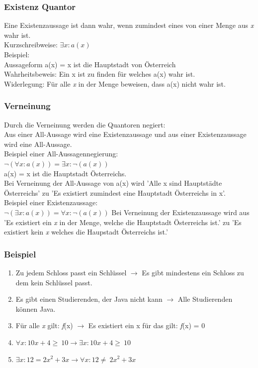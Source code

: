 \documentclass{article}
\begin{document}
	\subsubsection{Existenz Quantor}
	Eine Existenzaussage ist dann wahr, wenn zumindest eines von einer Menge aus \textit{x} wahr ist. \\
	Kurzschreibweise:
	$\exists x:a(x)$ \\
	Beispiel:\\
	Aussageform a(x) = x ist die Hauptstadt von Österreich \\
	Wahrheitsbeweis: Ein x ist zu finden für welches a(x) wahr ist. \\
	Widerlegung: Für alle \textit{x} in der Menge beweisen, dass a(x) nicht wahr ist.
	\subsubsection{Verneinung}
	Durch die Verneinung werden die Quantoren negiert: \\
	Aus einer All-Aussage wird eine Existenzaussage und aus einer Existenzaussage wird eine All-Aussage. \\

	Beispiel einer All-Aussagennegierung: \\
	$\neg(\forall x:a(x)) = \exists x:\neg(a(x))$ \\
	a(x) = x ist die Hauptstadt Österreichs. \\
	Bei Verneinung der All-Aussage von a(x) wird 'Alle x sind Hauptstädte Österreichs' zu 'Es existiert zumindest eine Hauptstadt Österreichs in x'. \\
	Beispiel einer Existenzaussage: \\
	$\neg (\exists x:a(x)) = \forall x:\neg (a(x))$
	Bei Verneinung der Existenzaussage wird aus 'Es existiert ein \textit{x} in der Menge, welche die Hauptstadt Österreichs ist.' zu 'Es existiert kein \textit{x} welches die Haupstadt Österreichs ist.'
	\subsubsection{Beispiel}
	\begin{enumerate}
		\item{Zu jedem Schloss passt ein Schlüssel $\to$ Es gibt mindestens ein Schloss zu dem kein Schlüssel passt.}
		\item{Es gibt einen Studierenden, der Java nicht kann $\to$ Alle Studierenden können Java.}
		\item{Für alle \textit{x} gilt: \textit{f}(x) $\to$ Es existiert ein x für das gilt: \textit{f}(x) = 0}
		\item{$\forall \textit{x}:10x+4\geq\ 10 \to \exists \textit{x}:10x + 4 \geq\ 10$}
		\item{$\exists \textit{x}: 12 = 2x^2+3x \to \forall \textit{x}:12 \neq\ 2x^2+3x$}
	\end{enumerate}
\end{document}
